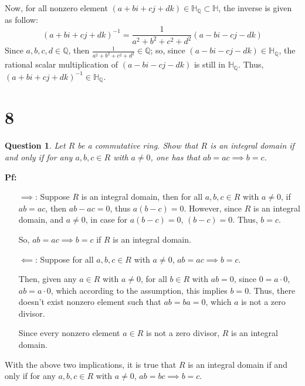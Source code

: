 \documentclass{article}
\newtheorem{question}{Question}
\begin{document}
Now, for all nonzero element $(a+bi+cj+dk)\in \mathbb{H_Q} \subset \mathbb{H}$, the inverse is given as follow:
$$(a+bi+cj+dk)^{-1}=\frac{1}{a^2+b^2+c^2+d^2}(a-bi-cj-dk)$$
Since $a,b,c,d\in \mathbb{Q}$, then $\frac{1}{a^2+b^2+c^2+d^2}\in \mathbb{Q}$; so, since $(a-bi-cj-dk)\in \mathbb{H_Q}$, the rational scalar multiplication of $(a-bi-cj-dk)$
is still in $\mathbb{H_Q}$. Thus, $(a+bi+cj+dk)^{-1}\in \mathbb{H_Q}$.

\break

\section*{8}
\begin{myBox}[]{}
    \begin{question}
        Let $R$ be a commutative ring. Show that $R$ is an integral domain if and only if for
        any $a, b, c \in R$ with $a\neq 0$, one has that $ab = ac \implies b = c$.
    \end{question}
\end{myBox}

\textbf{Pf:}

\begin{itemize}
    \item[$\implies$:] Suppose $R$ is an integral domain, then for all $a,b,c\in R$ with $a\neq 0$,
    if $ab=ac$, then $ab-ac=0$, thus $a(b-c)=0$. However, since $R$ is an integral domain, and $a\neq 0$,
    in case for $a(b-c)=0$, $(b-c)=0$. Thus, $b=c$.

    So, $ab=ac \implies b=c$ if $R$ is an integral domain.

    \hfill

    \item[$\impliedby$:] Suppose for all $a,b,c\in R$ with $a\neq 0$, $ab=ac\implies b=c$.
    
    Then, given any $a\in R$ with $a\neq 0$, for all $b\in R$ with $ab=0$, since $0 = a\cdot 0$,
    $ab= a\cdot 0$, which according to the assumption, this implies $b=0$. 
    Thus, there doesn't exist nonzero element such that $ab=ba=0$, which $a$ is not a zero divisor.

    Since every nonzero element $a\in R$ is not a zero divisor, $R$ is an integral domain.
\end{itemize}

With the above two implications, it is true that $R$ is an integral domain if and only if for any $a,b,c\in R$ with $a\neq 0$,
$ab=bc\implies b=c$.
\end{document}

